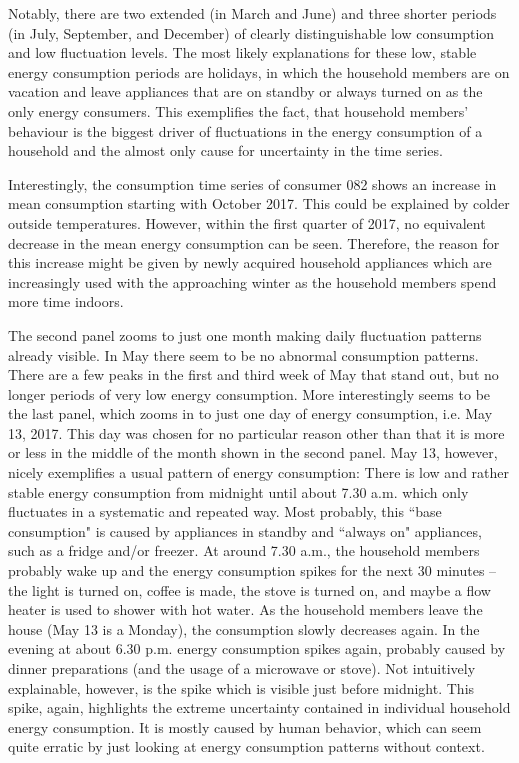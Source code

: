 Notably, there are two extended (in March and June) and three shorter periods (in July, September, and December) of clearly distinguishable low consumption and low fluctuation levels. The most likely explanations for these low, stable energy consumption periods are holidays, in which the household members are on vacation and leave appliances that are on standby or always turned on as the only energy consumers. This exemplifies the fact, that household members' behaviour is the biggest driver of fluctuations in the energy consumption of a household and the almost only cause for uncertainty in the time series.

Interestingly, the consumption time series of consumer 082 shows an increase in mean consumption starting with October 2017. This could be explained by colder outside temperatures. However, within the first quarter of 2017, no equivalent decrease in the mean energy consumption can be seen. Therefore, the reason for this increase might be given by newly acquired household appliances which are increasingly used with the approaching winter as the household members spend more time indoors.

The second panel zooms to just one month making daily fluctuation patterns already visible. In May there seem to be no abnormal consumption patterns. There are a few peaks in the first and third week of May that stand out, but no longer periods of very low energy consumption. More interestingly seems to be the last panel, which zooms in to just one day of energy consumption, i.e. May 13, 2017. This day was chosen for no particular reason other than that it is more or less in the middle of the month shown in the second panel. May 13, however, nicely exemplifies a usual pattern of energy consumption: There is low and rather stable energy consumption from midnight until about 7.30 a.m. which only fluctuates in a systematic and repeated way. Most probably, this ``base consumption" is caused by appliances in standby and ``always on" appliances, such as a fridge and/or freezer. At around 7.30 a.m., the household members probably wake up and the energy consumption spikes for the next 30 minutes -- the light is turned on, coffee is made, the stove is turned on, and maybe a flow heater is used to shower with hot water. As the household members leave the house (May 13 is a Monday), the consumption slowly decreases again. In the evening at about 6.30 p.m. energy consumption spikes again, probably caused by dinner preparations (and the usage of a microwave or stove). Not intuitively explainable, however, is the spike which is visible just before midnight. This spike, again, highlights the extreme uncertainty contained in individual household energy consumption. It is mostly caused by human behavior, which can seem quite erratic by just looking at energy consumption patterns without context.

